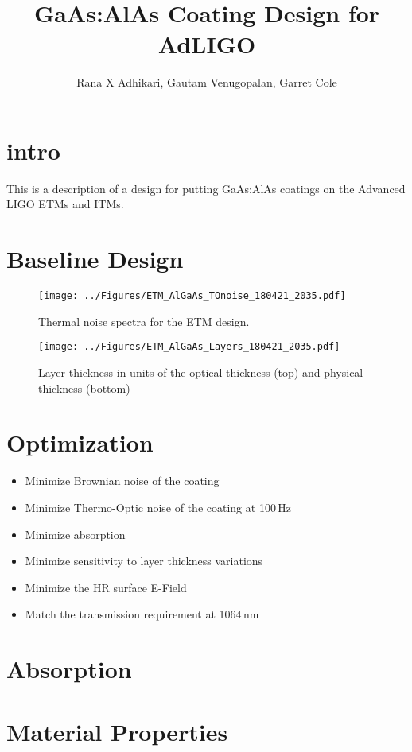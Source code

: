 \documentclass{lscdoc}
\author{Rana X Adhikari, Gautam Venugopalan, Garret Cole}
\title{GaAs:AlAs Coating Design for AdLIGO}
\begin{document}
%

\tableofcontents
\clearpage

\section{intro}
This is a description of a design for putting GaAs:AlAs coatings on the Advanced LIGO ETMs and ITMs.

\clearpage
\section{Baseline Design}
\begin{figure}
  \centering
  \texttt{[image: ../Figures/ETM\_AlGaAs\_TOnoise\_180421\_2035.pdf]}
  \caption[ETM Displacement noise]{Thermal noise spectra for the ETM design.}
  \label{fig:ETMnoise}
\end{figure}

\begin{figure}
  \centering
  \texttt{[image: ../Figures/ETM\_AlGaAs\_Layers\_180421\_2035.pdf]}
  \caption[ETM Design]{Layer thickness in units of the optical thickness (top) and physical thickness (bottom)}
  \label{fig:ETMdesign}
\end{figure}

\clearpage
\section{Optimization}
\begin{itemize}
\item Minimize Brownian noise of the coating
\item Minimize Thermo-Optic noise of the coating at 100\,Hz
\item Minimize absorption
\item Minimize sensitivity to layer thickness variations
\item Minimize the HR surface E-Field
\item Match the transmission requirement at 1064\,nm

\end{itemize}

\section{Absorption}

\appendix
\section{Material Properties}
\end{document}
